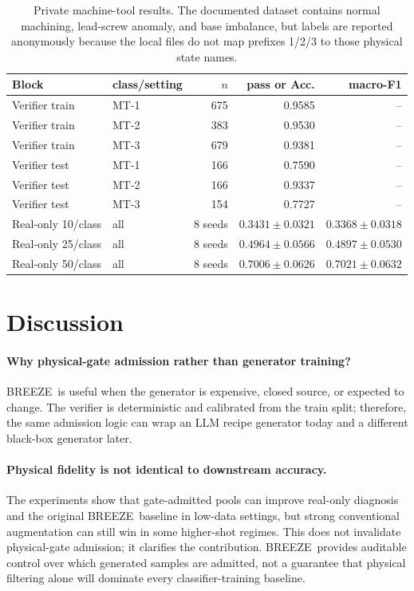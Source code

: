 \documentclass[review,3p,times]{elsarticle}
\newcommand{\breeze}{BREEZE}
\begin{document}
\begin{table}[H]
\centering
\caption{Private machine-tool results. The documented dataset contains normal
machining, lead-screw anomaly, and base imbalance, but labels are reported
anonymously because the local files do not map prefixes 1/2/3 to those physical
state names.}
\label{tab:mt}
\begin{tabular}{llrrr}
\toprule
Block & class/setting & $n$ & pass or Acc. & macro-F1 \\
\midrule
Verifier train & MT-1 & 675 & 0.9585 & -- \\
Verifier train & MT-2 & 383 & 0.9530 & -- \\
Verifier train & MT-3 & 679 & 0.9381 & -- \\
Verifier test & MT-1 & 166 & 0.7590 & -- \\
Verifier test & MT-2 & 166 & 0.9337 & -- \\
Verifier test & MT-3 & 154 & 0.7727 & -- \\
Real-only 10/class & all & 8 seeds & $0.3431\pm0.0321$ & $0.3368\pm0.0318$ \\
Real-only 25/class & all & 8 seeds & $0.4964\pm0.0566$ & $0.4897\pm0.0530$ \\
Real-only 50/class & all & 8 seeds & $0.7006\pm0.0626$ & $0.7021\pm0.0632$ \\
\bottomrule
\end{tabular}
\end{table}

\section{Discussion}
\label{sec:discussion}

\paragraph{Why physical-gate admission rather than generator training?}
\breeze\ is useful when the generator is expensive, closed source, or expected
to change. The verifier is deterministic and calibrated from the train split;
therefore, the same admission logic can wrap an LLM recipe generator today and
a different black-box generator later.

\paragraph{Physical fidelity is not identical to downstream accuracy.}
The experiments show that gate-admitted pools can improve real-only diagnosis
and the original \breeze\ baseline in low-data settings, but strong
conventional augmentation can still win in some higher-shot regimes. This does
not invalidate physical-gate admission; it clarifies the contribution.
\breeze\ provides auditable control over which generated samples are admitted,
not a guarantee that physical filtering alone will dominate every
classifier-training baseline.
\end{document}
